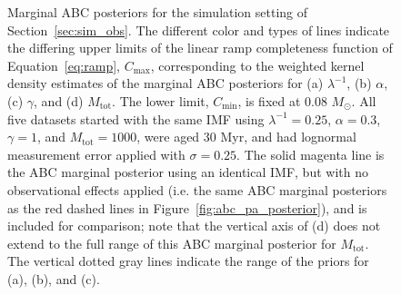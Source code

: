 \documentclass[ejs]{imsart}
\numberwithin{equation}{section}
\theoremstyle{plain}
\newcommand{\Msun}{M_{\odot}}
\newcommand{\Cmin}{C_{\text{min}}}
\newcommand{\Cmax}{C_{\text{max}}}
\newcommand{\Mtot}{M_{\text{tot}}}
\begin{document}
\begin{figure}[htbp]
\begin{subfigure}{0.48\textwidth}
\end{subfigure}
%
 \caption{Marginal ABC posteriors for the simulation setting of Section~\ref{sec:sim_obs}.  The different color and types of lines indicate the differing upper limits of the linear ramp completeness function of Equation~\eqref{eq:ramp}, $\Cmax$, corresponding to the weighted kernel density estimates of the marginal ABC posteriors for (a) $\lambda^{-1}$, (b) $\alpha$, (c) $\gamma$, and (d) $\Mtot$.  
The lower limit, $\Cmin$, is fixed at 0.08 $\Msun$.  
All five datasets started with the same IMF using $\lambda^{-1} = 0.25$, $\alpha = 0.3$, $\gamma = 1$, and $\Mtot = 1000$, were aged 30 Myr, and had lognormal measurement error applied with $\sigma = 0.25$.
The solid magenta line is the ABC marginal posterior using an identical IMF, but with no observational effects applied (i.e. the same ABC marginal posteriors as the red dashed lines in Figure~\ref{fig:abc_pa_posterior}), and is included for comparison; note that the vertical axis of (d) does not extend to the full range of this ABC marginal posterior for $\Mtot$.
The vertical dotted gray lines indicate the range of the priors for (a), (b), and (c).
   }
   \label{fig:abc_pa_posterior_obs}
\end{figure}
\end{document}
